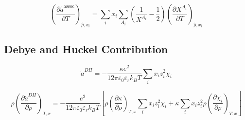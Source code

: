 \documentclass[12pt, letterpaper]{article}
\begin{document}
\begin{equation}
    \left(\frac{\partial\tilde{a}^{\mathrm{assoc}}}{\partial T}\right)_{\hat{\rho},x_i}
    =
    \sum_i x_i \sum_{A_i}
    \left(\frac{1}{X^{A_i}}-\frac{1}{2}\right)
    \left(\frac{\partial X^{A_i}}{\partial T}\right)_{\hat{\rho},x_i}
    \label{eq:assoc_ares_dT}
\end{equation}


\subsection{Debye and Huckel Contribution}


\begin{equation}
    \tilde{a}^{DH}=-\frac{\kappa e^{2}}{12\pi\varepsilon_{0}\varepsilon_{r}k_{B}T}\sum_{i}x_{i}z_{i}^{2}\chi_{i}
    \label{eq:ares_dh}
\end{equation}



\begin{equation}
    \rho\left(\frac{\partial\tilde{a}^{DH}}{\partial\rho}\right)_{T,x}
    =
    -\frac{e^2}{12\pi\varepsilon_0\varepsilon_r k_B T}
    \left[
        \rho\left(\frac{\partial \kappa}{\partial \rho}\right)_{T,x}\sum_i x_i z_i^2 \chi_i
        +
        \kappa\sum_i x_i z_i^2 \rho\left(\frac{\partial \chi_i}{\partial \rho}\right)_{T,x}
    \right]
    \label{eq:dh_ares_dadrho}
\end{equation}

\end{document}
